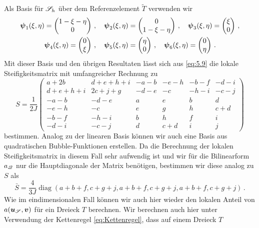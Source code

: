 Als Basis für $\mathscr S_h$ über dem Referenzelement $\widetilde T$ verwenden wir
\begin{align*}
	 \boldsymbol \psi_1(\xi,\eta) = \begin{pmatrix} 1-\xi-\eta \\ 0 \end{pmatrix}  \, , \quad \boldsymbol \psi_2(\xi,\eta) & = \begin{pmatrix} 0 \\ 1-\xi-\eta  \end{pmatrix} \, , \quad \boldsymbol \psi_3(\xi,\eta) = \begin{pmatrix} \xi \\ 0 \end{pmatrix}  \, , \\
	  \boldsymbol \psi_4(\xi,\eta)  = \begin{pmatrix} 0 \\ \xi  \end{pmatrix} \, , \quad
	 \boldsymbol \psi_5(\xi,\eta) & = \begin{pmatrix} \eta \\ 0\end{pmatrix}  \, , \quad  \boldsymbol \psi_6(\xi,\eta)  = \begin{pmatrix} 0 \\  \eta  \end{pmatrix}\, .
\end{align*}
Mit dieser Basis und den übrigen Resultaten lässt sich aus \eqref{eq:5.9} die lokale Steifigkeitsmatrix mit umfangreicher Rechnung zu
\[
	S = \frac 1{2J} \begin{pmatrix}
					a+ 2b & d+e+h+i & -a-b & -e-h & -b-f & -d-i \\
					d+e+h+i & 2c+j+g &  -d-e & -c & -h-i & -c-j \\
					-a-b & -d-e & a & e & b & d \\
					-e-h & -c & e & g & h & c+d \\
					-b-f & -h-i & b & h & f & i \\
					-d-i & -c-j & d & c+d & i & j
				\end{pmatrix}
\]
bestimmen. Analog zu der linearen Basis können wir auch eine Basis aus quadratischen Bubble-Funktionen erstellen. Da die Berechnung der  lokalen Steifigkeitsmatrix in diesem Fall sehr aufwendig ist und wir für die Bilinearform $a_{\mathscr Q}$ nur die Hauptdiagonale der Matrix benötigen, bestimmen wir diese analog zu $S$ als
\[
	\bar S =\frac 4{3J} \operatorname{diag} (a+b+f, c+g+j, a+b+f, c+g+j, a+b+f, c+g+j) \, .
\]
Wie im eindimensionalen Fall können wir auch hier wieder den lokalen Anteil von $a(\boldsymbol u_{\mathscr S},\boldsymbol v)$ für ein Dreieck $T$ berechnen. Wir berechnen auch hier unter Verwendung der Kettenregel \eqref{eq:Kettenregel}, dass auf einem Dreieck $T$
